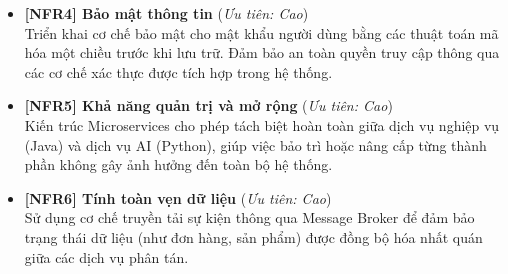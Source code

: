 \begin{itemize}
    \item \textbf{[NFR4] Bảo mật thông tin} \hfill (\textit{Ưu tiên: Cao})\\
    Triển khai cơ chế bảo mật cho mật khẩu người dùng bằng các thuật toán mã hóa một chiều trước khi lưu trữ. Đảm bảo an toàn quyền truy cập thông qua các cơ chế xác thực được tích hợp trong hệ thống.

    \item \textbf{[NFR5] Khả năng quản trị và mở rộng} \hfill (\textit{Ưu tiên: Cao})\\
    Kiến trúc Microservices cho phép tách biệt hoàn toàn giữa dịch vụ nghiệp vụ (Java) và dịch vụ AI (Python), giúp việc bảo trì hoặc nâng cấp từng thành phần không gây ảnh hưởng đến toàn bộ hệ thống.

    \item \textbf{[NFR6] Tính toàn vẹn dữ liệu} \hfill (\textit{Ưu tiên: Cao})\\
    Sử dụng cơ chế truyền tải sự kiện thông qua Message Broker để đảm bảo trạng thái dữ liệu (như đơn hàng, sản phẩm) được đồng bộ hóa nhất quán giữa các dịch vụ phân tán.
\end{itemize}

